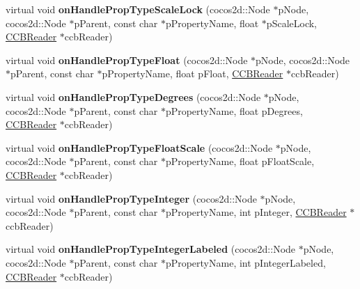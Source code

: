\begin{DoxyCompactItemize}
\item 
\mbox{\label{classcocosbuilder_1_1NodeLoader_ac035814ec325a6d59c0970d6328a5b56}} 
virtual void {\bfseries on\+Handle\+Prop\+Type\+Scale\+Lock} (cocos2d\+::\+Node $\ast$p\+Node, cocos2d\+::\+Node $\ast$p\+Parent, const char $\ast$p\+Property\+Name, float $\ast$p\+Scale\+Lock, \hyperlink{classcocosbuilder_1_1CCBReader}{C\+C\+B\+Reader} $\ast$ccb\+Reader)
\item 
\mbox{\label{classcocosbuilder_1_1NodeLoader_a491b8f52f091d76610ec37775ee6b7a5}} 
virtual void {\bfseries on\+Handle\+Prop\+Type\+Float} (cocos2d\+::\+Node $\ast$p\+Node, cocos2d\+::\+Node $\ast$p\+Parent, const char $\ast$p\+Property\+Name, float p\+Float, \hyperlink{classcocosbuilder_1_1CCBReader}{C\+C\+B\+Reader} $\ast$ccb\+Reader)
\item 
\mbox{\label{classcocosbuilder_1_1NodeLoader_a7653ca06b571e28a247e61ea780f3f42}} 
virtual void {\bfseries on\+Handle\+Prop\+Type\+Degrees} (cocos2d\+::\+Node $\ast$p\+Node, cocos2d\+::\+Node $\ast$p\+Parent, const char $\ast$p\+Property\+Name, float p\+Degrees, \hyperlink{classcocosbuilder_1_1CCBReader}{C\+C\+B\+Reader} $\ast$ccb\+Reader)
\item 
\mbox{\label{classcocosbuilder_1_1NodeLoader_ad13ea204b3463bb61c6f3e63105c59c5}} 
virtual void {\bfseries on\+Handle\+Prop\+Type\+Float\+Scale} (cocos2d\+::\+Node $\ast$p\+Node, cocos2d\+::\+Node $\ast$p\+Parent, const char $\ast$p\+Property\+Name, float p\+Float\+Scale, \hyperlink{classcocosbuilder_1_1CCBReader}{C\+C\+B\+Reader} $\ast$ccb\+Reader)
\item 
\mbox{\label{classcocosbuilder_1_1NodeLoader_aa960cf220b4f85736ee7b4f7331cfd81}} 
virtual void {\bfseries on\+Handle\+Prop\+Type\+Integer} (cocos2d\+::\+Node $\ast$p\+Node, cocos2d\+::\+Node $\ast$p\+Parent, const char $\ast$p\+Property\+Name, int p\+Integer, \hyperlink{classcocosbuilder_1_1CCBReader}{C\+C\+B\+Reader} $\ast$ccb\+Reader)
\item 
\mbox{\label{classcocosbuilder_1_1NodeLoader_a60cfd4a93ecf30de29d94499e8c88b9f}} 
virtual void {\bfseries on\+Handle\+Prop\+Type\+Integer\+Labeled} (cocos2d\+::\+Node $\ast$p\+Node, cocos2d\+::\+Node $\ast$p\+Parent, const char $\ast$p\+Property\+Name, int p\+Integer\+Labeled, \hyperlink{classcocosbuilder_1_1CCBReader}{C\+C\+B\+Reader} $\ast$ccb\+Reader)

\end{DoxyCompactItemize}
